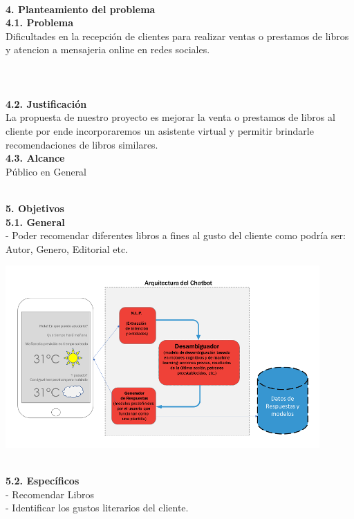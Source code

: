 \begin{flushleft}
\begin{itemize}
\textbf{ }\\

\textbf{4.	Planteamiento del problema}\\
\textbf{4.1. 	Problema}\\

Dificultades en la recepción de clientes para realizar ventas o prestamos de libros y atencion a mensajeria online en redes sociales.\textbf{ }\\
\textbf{ }\\
\textbf{ }\\
\textbf{ }\\
\textbf{4.2.	Justificación }\\

La propuesta de nuestro proyecto es mejorar la venta o prestamos de libros al cliente por ende incorporaremos un asistente virtual y permitir brindarle recomendaciones de libros similares. 
\textbf{ }\\
\textbf{4.3.	Alcance }\\
Público en General


\textbf{ }\\
\textbf{5.      Objetivos}\\
\textbf{5.1.   General}\\
-	Poder recomendar diferentes libros a fines al gusto del cliente como podría ser: Autor, Genero, Editorial etc.
\begin{center}
	\includegraphics[width=12cm]{./Imagenes/chatbot} 
	\end{center}

\textbf{ }\\

\textbf{5.2.   Específicos}\\

-	Recomendar Libros\\
-	Identificar los gustos literarios del cliente.\\


\end{itemize}
\end{flushleft}
